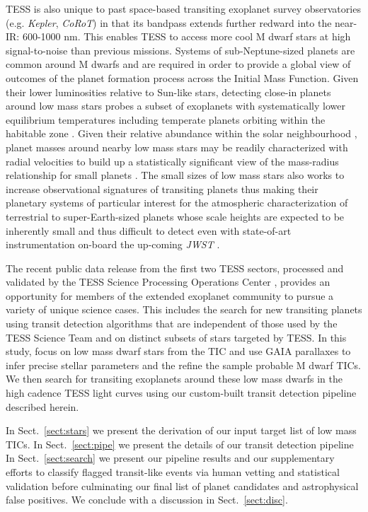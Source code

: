 TESS is also unique to past space-based transiting exoplanet survey observatories
(e.g. \emph{Kepler}, \emph{CoRoT}) in that its bandpass extends further redward into the near-IR:
600-1000 nm. This enables TESS to access more cool M dwarf stars at high signal-to-noise
than previous missions. Systems of sub-Neptune-sized planets are common around M dwarfs
\citep{dressing13,morton14,dressing15a} and are required in order to provide a global view of
outcomes of the planet formation process across the Initial Mass Function.
Given their lower luminosities relative
to Sun-like stars, detecting close-in planets around low mass stars probes a subset of exoplanets
with systematically lower equilibrium temperatures including temperate planets orbiting
within the habitable zone \citep{kasting93,kopparapu13}. Given their relative
abundance within the solar neighbourhood \citep{winters15}, planet masses around nearby low mass
stars may be
readily characterized with radial velocities to build up a statistically significant view of the
mass-radius relationship for small planets \citep{weiss14,rogers15,wolfgang16,chen17}. The small sizes
of low mass stars also works to
increase observational signatures of transiting planets thus making their planetary systems of
particular interest for the atmospheric characterization of terrestrial to super-Earth-sized planets
whose scale heights are expected to be inherently small \citep[$\lesssim$][]{millerricci09}
and thus difficult to detect even with state-of-art instrumentation on-board the up-coming
\emph{JWST} \citep{morley17}.

The recent public data release from the first two TESS sectors, processed and validated by the
TESS Science Processing Operations Center \citep{jenkins16,twicken18,li18}, provides an opportunity
for members of the extended exoplanet community to pursue a variety of unique science cases. This
includes the search for new transiting planets using transit detection algorithms that are independent
of those used by the TESS Science Team and on distinct subsets of stars targeted by TESS.
In this study, focus on low mass dwarf stars from the TIC and use GAIA parallaxes to infer precise
stellar parameters and the refine the sample probable M dwarf TICs. We then search for transiting
exoplanets around these low mass dwarfs in the high cadence TESS light curves using our
custom-built transit detection pipeline described herein.

In Sect.~\ref{sect:stars} we present the derivation of our input target list of low mass TICs.
In Sect.~\ref{sect:pipe} we present the details of our transit detection pipeline  In
Sect.~\ref{sect:search} we present our pipeline results and our supplementary efforts to
classify flagged transit-like events via human vetting and statistical validation before
culminating our final list of planet candidates and astrophysical false positives.
We conclude with a discussion in Sect.~\ref{sect:disc}.


